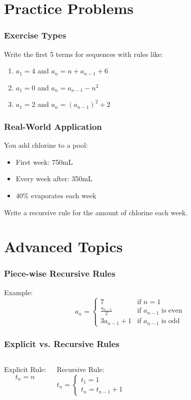 \documentclass{beamer}
\begin{document}
\section{Practice Problems}

\begin{frame}
\frametitle{Exercise Types}
Write the first 5 terms for sequences with rules like:
\begin{enumerate}
    \item $a_1 = 4$ and $a_n = n + a_{n-1} + 6$
    \item $a_1 = 0$ and $a_n = a_{n-1} - n^2$
    \item $a_1 = 2$ and $a_n = (a_{n-1})^2 + 2$
\end{enumerate}
\end{frame}

\begin{frame}
\frametitle{Real-World Application}
\begin{example}
You add chlorine to a pool:
\begin{itemize}
    \item First week: 750mL
    \item Every week after: 350mL
    \item 40\% evaporates each week
\end{itemize}
Write a recursive rule for the amount of chlorine each week.
\end{example}
\end{frame}

\section{Advanced Topics}

\begin{frame}
\frametitle{Piece-wise Recursive Rules}
Example:
\[ a_n = \begin{cases}
7 & \text{if } n = 1 \\
\frac{a_{n-1}}{2} & \text{if } a_{n-1} \text{ is even} \\
3a_{n-1} + 1 & \text{if } a_{n-1} \text{ is odd}
\end{cases} \]
\end{frame}

\begin{frame}
\frametitle{Explicit vs. Recursive Rules}
\begin{columns}
Explicit Rule:
\[ t_n = n \]

Recursive Rule:
\[ t_n = \begin{cases}
t_1 = 1 \\
t_n = t_{n-1} + 1
\end{cases} \]
\end{columns}
\end{frame}
\end{document}
